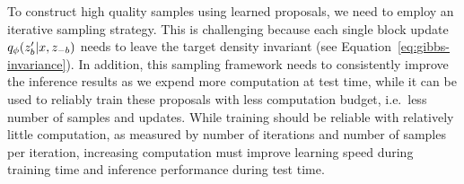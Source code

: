 \documentclass{article}
\theoremstyle{definition}
\begin{document}


To construct high quality samples using learned proposals, we need to employ an iterative sampling strategy. This is challenging because each single block update $q_\phi(z_b' | x, z_{-b})$ needs to leave the target density invariant (see Equation~\ref{eq:gibbs-invariance}).
In addition, this sampling framework needs to consistently improve the inference results as we expend more computation at test time, while it can be used to reliably train these proposals with less computation budget, i.e.~less number of samples and updates.
While training should be reliable with relatively little computation, as measured by number of iterations and number of samples per iteration, increasing computation must improve learning speed during training time and inference performance during test time.
\end{document}

